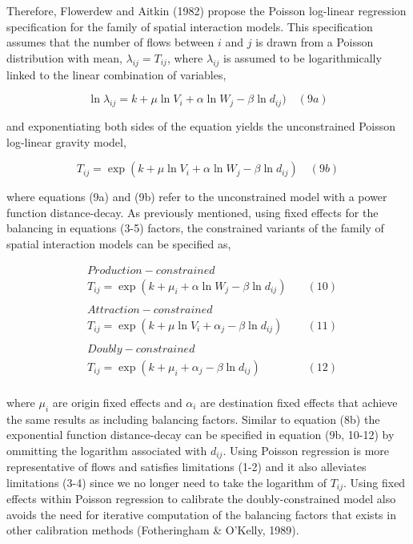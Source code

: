 \documentclass[11pt]{article}
\begin{document}
Therefore, Flowerdew and Aitkin (1982) propose the Poisson log-linear
regression specification for the family of spatial interaction models.
This specification assumes that the number of flows between \(i\) and
\(j\) is drawn from a Poisson distribution with mean,
\(\lambda_{ij} = T_{ij}\), where \(\lambda_{ij}\) is assumed to be
logarithmically linked to the linear combination of variables,

\[\ln{\lambda_{ij}} = k + \mu \ln V_{i} + \alpha \ln W_{j} - \beta \ln d_{ij}) \quad (9a)\]

and exponentiating both sides of the equation yields the unconstrained
Poisson log-linear gravity model,

\[T_{ij} = \exp(k + \mu \ln V_{i} + \alpha \ln W_{j} - \beta \ln d_{ij}) \quad (9b) \]

where equations (9a) and (9b) refer to the unconstrained model with a
power function distance-decay. As previously mentioned, using fixed
effects for the balancing in equations (3-5) factors, the constrained
variants of the family of spatial interaction models can be specified
as,

\[
\begin{align}
&Production-constrained \\
&T_{ij} = \exp(k + \mu_{i} + \alpha \ln W_{j} - \beta \ln d_{ij}) \quad & (10) \\
\\
&Attraction-constrained \\
&T_{ij} = \exp(k + \mu \ln V_{i} + \alpha_{j} - \beta \ln d_{ij}) \quad & (11) \\
\\
&Doubly-constrained \\
&T_{ij} = \exp(k + \mu_{i} + \alpha_{j} - \beta \ln d_{ij}) \quad & (12) \\
\end{align}
\]

where \(\mu_{i}\) are origin fixed effects and \(\alpha_{i}\) are
destination fixed effects that achieve the same results as including
balancing factors. Similar to equation (8b) the exponential function
distance-decay can be specified in equation (9b, 10-12) by ommitting the
logarithm associated with \(d_{ij}\). Using Poisson regression is more
representative of flows and satisfies limitations (1-2) and it also
alleviates limitations (3-4) since we no longer need to take the
logarithm of \(T_{ij}\). Using fixed effects within Poisson regression
to calibrate the doubly-constrained model also avoids the need for
iterative computation of the balancing factors that exists in other
calibration methods (Fotheringham \& O'Kelly, 1989).
\end{document}
